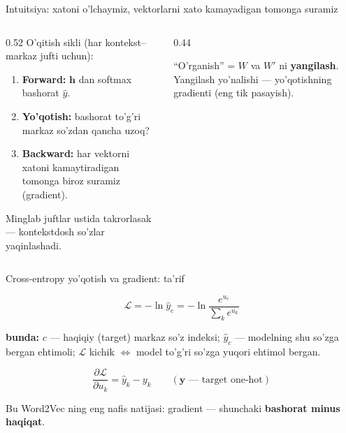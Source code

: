 \documentclass[aspectratio=169,11pt]{beamer}
\newcommand{\bunda}[1]{{\small\textbf{bunda:}\; #1}}
\begin{document}
\begin{frame}{Intuitsiya: xatoni o'lchaymiz, vektorlarni xato kamayadigan tomonga suramiz}
  \begin{columns}[T]
    \begin{column}{0.52\textwidth}
      \small
      O'qitish sikli (har kontekst--markaz jufti uchun):
      \begin{enumerate}\setlength\itemsep{2pt}
        \item \textbf{Forward:} $\mathbf{h}$ dan softmax bashorat $\hat{y}$.
        \item \textbf{Yo'qotish:} bashorat to'g'ri markaz so'zdan qancha uzoq?
        \item \textbf{Backward:} har vektorni xatoni kamaytiradigan tomonga
              biroz suramiz (gradient).
      \end{enumerate}
      \vspace{4pt}
      Minglab juftlar ustida takrorlasak --- kontekstdosh so'zlar yaqinlashadi.
    \end{column}
    \begin{column}{0.44\textwidth}
      \begin{tcolorbox}[okbox,top=2pt,bottom=2pt]
        \footnotesize
        ``O'rganish'' = $W$ va $W'$ ni \textbf{yangilash}. Yangilash yo'nalishi ---
        yo'qotishning gradienti (eng tik pasayish).
      \end{tcolorbox}
    \end{column}
  \end{columns}
\end{frame}

\begin{frame}{Cross-entropy yo'qotish va gradient: ta'rif}
  \begin{tcolorbox}[defbox,title=Ta'rif: cross-entropy yo'qotish]
    \vspace{-0.4em}
    $$ \mathcal{L} = -\ln \hat{y}_{c} = -\ln \frac{e^{u_c}}{\sum_{k} e^{u_k}} $$
  \end{tcolorbox}
  \vspace{2pt}
  \bunda{$c$ --- haqiqiy (target) markaz so'z indeksi; $\hat{y}_c$ --- modelning
  shu so'zga bergan ehtimoli; $\mathcal{L}$ kichik $\Leftrightarrow$ model to'g'ri
  so'zga yuqori ehtimol bergan.}
  \vspace{4pt}
  \begin{tcolorbox}[defbox,title={Ta'rif: chiqish balli bo'yicha gradient}]
    \vspace{-0.4em}
    $$ \frac{\partial \mathcal{L}}{\partial u_k} = \hat{y}_k - y_k
       \qquad (\mathbf{y}\text{ --- target one-hot}) $$
  \end{tcolorbox}
  \footnotesize Bu Word2Vec ning eng nafis natijasi: gradient --- shunchaki
  \textbf{bashorat minus haqiqat}.
\end{frame}
\end{document}
